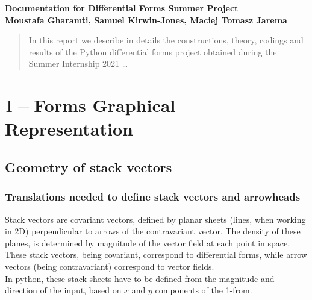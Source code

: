 \documentclass[12pt]{report}
\begin{document}
\begin{titlepage}
\begin{center}
\vspace*{1cm}
\LARGE
\textbf{Documentation for Differential Forms Summer Project}\\
\vspace{5cm}
\normalsize
\textbf{Moustafa Gharamti, Samuel Kirwin-Jones, Maciej Tomasz Jarema}\\

\end{center}
\end{titlepage}


\begin{abstract}
In this report we describe in details the constructions, theory, codings and results of the Python differential forms project obtained during the Summer Internship 2021 \dots
\end{abstract}


\tableofcontents

\chapter{$1-$Forms Graphical Representation}
\section{Geometry of stack vectors}

\subsection{Translations needed to define stack vectors and arrowheads}
Stack vectors are covariant vectors, defined by planar sheets (lines, when working in 2D) perpendicular to arrows of the contravariant vector. The density of these planes, is determined by magnitude of the vector field at each point in space. These stack vectors, being covariant, correspond to differential forms, while arrow vectors (being contravariant) correspond to vector fields.\\
In python, these stack sheets have to be defined from the magnitude and direction of the input, based on \(x\) and \(y\) components of the 1-from.
\end{document}
